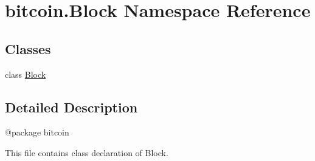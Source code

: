 \hypertarget{namespacebitcoin_1_1Block}{}\section{bitcoin.\+Block Namespace Reference}
\label{namespacebitcoin_1_1Block}
\subsection*{Classes}
\begin{DoxyCompactItemize}
\item 
class \hyperlink{classbitcoin_1_1Block_1_1Block}{Block}
\end{DoxyCompactItemize}


\subsection{Detailed Description}
\begin{DoxyVerb}@package bitcoin

This file contains class declaration of Block.
\end{DoxyVerb}
 